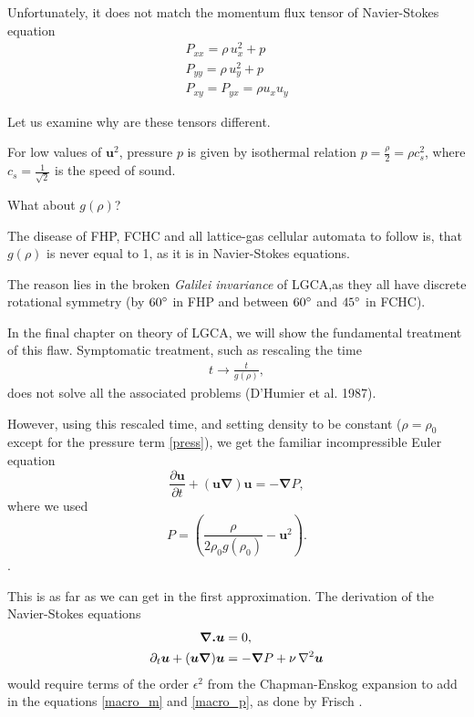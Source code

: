 Unfortunately, it does not match the momentum flux tensor of Navier-Stokes equation
\begin{equation} \label{NST}
\begin{split}
P_{xx} = \rho \, u_x^2 + p\\
P_{yy} = \rho\, u_y^2 + p\\
P_{xy} = P_{yx} = \rho u_x u_y
\end{split}
\end{equation}

Let us examine why are these tensors different.

For low values of $\bm{u}^2$, pressure $p$ is given by isothermal relation \cite{wol} $p = \frac{\rho}{2} = \rho c_s^2$, where $c_s = \frac{1}{\sqrt{2}}$ is the speed of sound.

What about $g(\rho)$?  

The disease of FHP, FCHC and all lattice-gas cellular automata to follow is, that $g(\rho)$ is never equal to 1, as it is in Navier-Stokes equations.

The reason lies in the broken \textit{Galilei invariance} of LGCA,as they all have discrete rotational symmetry (by $60 \degree$ in FHP and between $60 \degree$ and $45 \degree$ in FCHC).

In the final chapter on theory of LGCA, we will show the fundamental treatment of this flaw. Symptomatic treatment, such as rescaling the time
\begin{align} \label{frac_resc}
t \rightarrow \frac{t}{g(\rho)},
\end{align}
does not solve all the associated problems (D'Humier et al. 1987).

However, using this rescaled time, and setting density to be constant ($\rho = \rho_0$ except for the pressure term \ref{press}), we get the familiar incompressible Euler equation
\begin{equation}
\frac{\partial \bm{u}}{\partial t} + (\bm{u} \bm{\nabla}) \bm{u} = -\bm{\nabla} P,
\end{equation}
where we used
\begin{equation} \label{press}
P = (\frac{\rho}{2\rho_0 g(\rho_0)} - \bm{u}^2).
\end{equation}.

This is as far as we can get in the first approximation.
The derivation of the Navier-Stokes equations
\begin{align}
\begin{split}
\bm{\nabla . u} &= 0, \\
\partial_t \bm{u} + (\bm{u \nabla})\bm{u} &= - \bm{\nabla} P + \nu \, \nabla^2 \bm{u}
\end{split}
\end{align}
would require terms of the order $\epsilon^2$  from the Chapman-Enskog expansion to add in the equations \ref{macro_m} and \ref{macro_p}, as done by Frisch \cite{frisch}.

